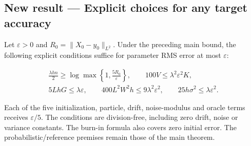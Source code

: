 \documentclass[11pt,a4paper]{report}
\begin{document}
\subsection{\texorpdfstring{New result — Explicit choices for any target accuracy}{New result — Explicit choices for any target accuracy}}



Let \(\varepsilon>0\) and \(R_0=\|X_0-y_0\|_{L^2}\). Under the preceding main bound, the following explicit conditions suffice for parameter RMS error at most \(\varepsilon\):



\[\begin{gathered}\frac{\lambda h n}{2}\ge\log\max\!\left\{1,\frac{5R_0}{\varepsilon}\right\},\qquad100V\le\lambda^2\varepsilon^2K,\\5LhG\le\lambda\varepsilon,\qquad400L^2W^2h\le9\lambda^2\varepsilon^2,\qquad25h\sigma^2\le\lambda\varepsilon^2.\end{gathered}\]



Each of the five initialization, particle, drift, noise-modulus and oracle terms receives \(\varepsilon/5\). The conditions are division-free, including zero drift, noise or variance constants. The burn-in formula also covers zero initial error. The probabilistic/\allowbreak{}reference premises remain those of the main theorem.
\end{document}
